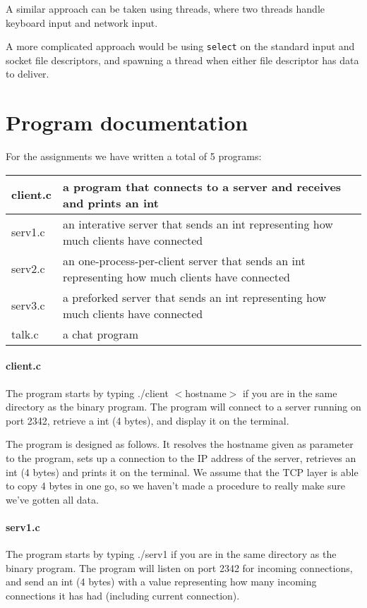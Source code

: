 \documentclass[a4paper,10pt]{article}
\begin{document}
A similar approach can be taken using threads, where two threads handle keyboard input and network input.

A more complicated approach would be using \texttt{select} on the standard input and socket file descriptors, and spawning a thread when either file descriptor has data to deliver.

\section{Program documentation}

For the assignments we have written a total of 5 programs:
\begin{center}
\begin{tabular}{ l | p{9cm} }
client.c & a program that connects to a server and receives and prints an int \\ \hline
serv1.c & an interative server that sends an int representing how much clients have connected \\ \hline
serv2.c & an one-process-per-client server that sends an int representing how much clients have connected \\ \hline
serv3.c & a preforked server that sends an int representing how much clients have connected \\ \hline
talk.c & a chat program
\end{tabular}
\end{center}

\paragraph{client.c}
The program starts by typing ./client $<$hostname$>$ if you are in the same directory as the binary program. The program will connect to a server running on port 2342, retrieve a int (4 bytes), and display it on the terminal.

The program is designed as follows. It resolves the hostname given as parameter to the program, sets up a connection to the IP address of the server, retrieves an int (4 bytes) and prints it on the terminal. We assume that the TCP layer is able to copy 4 bytes in one go, so we haven't made a procedure to really make sure we've gotten all data.

\paragraph{serv1.c}
The program starts by typing ./serv1 if you are in the same directory as the binary program. The program will listen on port 2342 for incoming connections, and send an int (4 bytes) with a value representing how many incoming connections it has had (including current connection).
\end{document}
